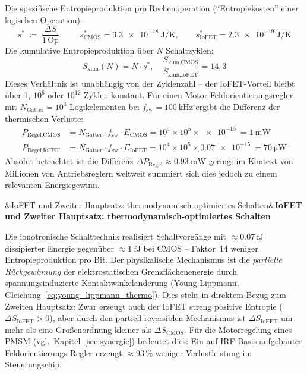 ﻿\documentclass[12pt, a4paper]{report}
\newenvironment{ergebnis}[1][]{%
  \begin{ergebnisframe}\sloppy%
  \ifx&#1&\else\textbf{#1}\par\smallskip\fi}{\end{ergebnisframe}}
\theoremstyle{definition}
\theoremstyle{remark}
\begin{document}
Die spezifische Entropieproduktion pro Rechenoperation (``Entropiekosten''
einer logischen Operation):
\begin{equation}
  s^*
  \;\coloneqq\; \frac{\Delta S}{1\,\text{Op}}:
  \qquad
  s^*_\text{CMOS}   = \SI{3.3e-18}{\joule\per\kelvin},
  \qquad
  s^*_\text{IoFET}  = \SI{2.3e-19}{\joule\per\kelvin}
  \label{eq:s_spezifisch}
\end{equation}
Die kumulative Entropieproduktion über $N$ Schaltzyklen:
\begin{equation}
  S_\text{kum}(N) = N \cdot s^*,
  \quad
  \frac{S_\text{kum,CMOS}}{S_\text{kum,IoFET}} = 14{,}3
  \label{eq:s_kum}
\end{equation}
Dieses Verhältnis ist unabhängig von der Zyklenzahl -- der IoFET-Vorteil
bleibt über 1, $10^6$ oder $10^{12}$ Zyklen konstant. Für einen
Motor-Feldorientierungsregler mit $N_\text{Gatter} = 10^4$ Logikelementen
bei $f_\text{sw} = \SI{100}{\kilo\hertz}$ ergibt die Differenz der
thermischen Verluste:
\begin{align}
  P_\text{Regel,CMOS}
    &= N_\text{Gatter} \cdot f_\text{sw} \cdot E_\text{CMOS}
    = 10^4 \times 10^5 \times \SI{e-15}{}
    = \SI{1}{\milli\watt}
    \label{eq:p_regel_cmos} \\
  P_\text{Regel,IoFET}
    &= N_\text{Gatter} \cdot f_\text{sw} \cdot E_\text{IoFET}
    = 10^4 \times 10^5 \times \SI{0.07e-15}{}
    = \SI{70}{\micro\watt}
    \label{eq:p_regel_iofet}
\end{align}
Absolut betrachtet ist die Differenz $\Delta P_\text{Regel} \approx \SI{0.93}{\milli\watt}$
gering; im Kontext von Millionen von Antriebsreglern weltweit summiert sich
dies jedoch zu einem relevanten Energiegewinn.

\begin{ergebnis}[IoFET und Zweiter Hauptsatz: thermodynamisch-optimiertes Schalten]
  Die ionotronische Schalttechnik realisiert Schaltvorgänge mit
  $\approx\SI{0.07}{\femto\joule}$ dissipierter Energie gegenüber
  $\approx\SI{1}{\femto\joule}$ bei CMOS -- Faktor~14 weniger
  Entropieproduktion pro Bit. Der physikalische Mechanismus ist die
  \emph{partielle Rückgewinnung} der elektrostatischen Grenzflächenenergie
  durch spannungsinduzierte Kontaktwinkeländerung
  (Young-Lippmann, Gleichung~\eqref{eq:young_lippmann_thermo}).
  Dies steht in direktem Bezug zum Zweiten Hauptsatz: Zwar erzeugt auch der
  IoFET streng positive Entropie ($\Delta S_\text{IoFET} > 0$), aber durch
  den partiell reversiblen Mechanismus ist $\Delta S_\text{IoFET}$
  um mehr als eine Größenordnung kleiner als $\Delta S_\text{CMOS}$.
  Für die Motorregelung eines PMSM (vgl.\ Kapitel~\ref{sec:synergie})
  bedeutet dies: Ein auf IRF-Basis aufgebauter Feldorientierungs-Regler
  erzeugt $\approx 93\,\%$ weniger Verlustleistung im Steuerungschip.
\end{ergebnis}
\end{document}
